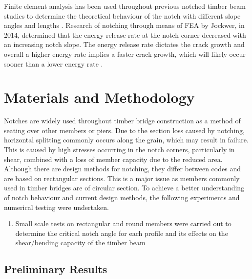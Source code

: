 \documentclass[11pt,a4paper]{article}
\numberwithin{equation}{subsection}
\begin{document}
\noindent
Finite element analysis has been used throughout previous notched timber beam studies to determine the theoretical behaviour of the notch with different slope angles and lengths \cite{jockwer_structural_2014}. Research of notching through means of FEA by Jockwer, in 2014, determined that the energy release rate at the notch corner decreased with an increasing notch slope. The energy release rate dictates the crack growth and overall a higher energy rate implies a faster crack growth, which will likely occur sooner than a lower energy rate \cite{jockwer_structural_2014}. 

\pagebreak

\section{Materials and Methodology}
Notches are widely used throughout timber bridge construction as a method of seating over other members or piers. Due to the section loss caused by notching, horizontal splitting commonly occurs along the grain, which may result in failure. This is caused by high stresses occurring in the notch corners, particularly in shear, combined with a loss of member capacity due to the reduced area. Although there are design methods for notching, they differ between codes and are based on rectangular sections. This is a major issue as members commonly used in timber bridges are of circular section. To achieve a better understanding of notch behaviour and current design methods, the following experiments and numerical testing were undertaken. 

	\begin{enumerate}
		\item Small scale tests on rectangular and round members were carried out to determine the critical notch angle for each profile and its effects on the shear/bending capacity of the timber beam
	\end{enumerate}

\subsection{Preliminary Results}
\end{document}
